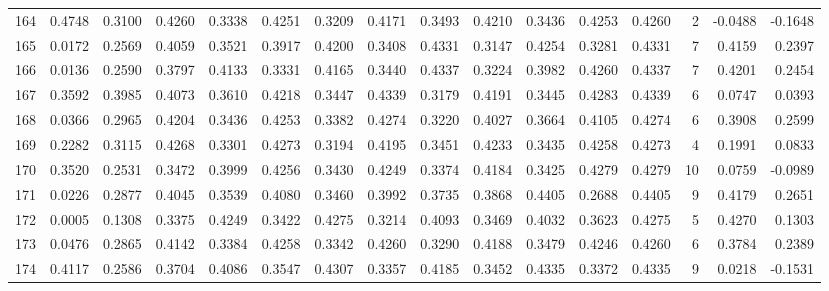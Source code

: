 \begin{tabular}{lrrrrrrrrrrrrrrr}
164 &      0.4748 &  0.3100 &  0.4260 &  0.3338 &  0.4251 &  0.3209 &  0.4171 &  0.3493 &  0.4210 &  0.3436 &   0.4253 &     0.4260 &      2 &                   -0.0488 &                    -0.1648 \\
165 &      0.0172 &  0.2569 &  0.4059 &  0.3521 &  0.3917 &  0.4200 &  0.3408 &  0.4331 &  0.3147 &  0.4254 &   0.3281 &     0.4331 &      7 &                    0.4159 &                     0.2397 \\
166 &      0.0136 &  0.2590 &  0.3797 &  0.4133 &  0.3331 &  0.4165 &  0.3440 &  0.4337 &  0.3224 &  0.3982 &   0.4260 &     0.4337 &      7 &                    0.4201 &                     0.2454 \\
167 &      0.3592 &  0.3985 &  0.4073 &  0.3610 &  0.4218 &  0.3447 &  0.4339 &  0.3179 &  0.4191 &  0.3445 &   0.4283 &     0.4339 &      6 &                    0.0747 &                     0.0393 \\
168 &      0.0366 &  0.2965 &  0.4204 &  0.3436 &  0.4253 &  0.3382 &  0.4274 &  0.3220 &  0.4027 &  0.3664 &   0.4105 &     0.4274 &      6 &                    0.3908 &                     0.2599 \\
169 &      0.2282 &  0.3115 &  0.4268 &  0.3301 &  0.4273 &  0.3194 &  0.4195 &  0.3451 &  0.4233 &  0.3435 &   0.4258 &     0.4273 &      4 &                    0.1991 &                     0.0833 \\
170 &      0.3520 &  0.2531 &  0.3472 &  0.3999 &  0.4256 &  0.3430 &  0.4249 &  0.3374 &  0.4184 &  0.3425 &   0.4279 &     0.4279 &     10 &                    0.0759 &                    -0.0989 \\
171 &      0.0226 &  0.2877 &  0.4045 &  0.3539 &  0.4080 &  0.3460 &  0.3992 &  0.3735 &  0.3868 &  0.4405 &   0.2688 &     0.4405 &      9 &                    0.4179 &                     0.2651 \\
172 &      0.0005 &  0.1308 &  0.3375 &  0.4249 &  0.3422 &  0.4275 &  0.3214 &  0.4093 &  0.3469 &  0.4032 &   0.3623 &     0.4275 &      5 &                    0.4270 &                     0.1303 \\
173 &      0.0476 &  0.2865 &  0.4142 &  0.3384 &  0.4258 &  0.3342 &  0.4260 &  0.3290 &  0.4188 &  0.3479 &   0.4246 &     0.4260 &      6 &                    0.3784 &                     0.2389 \\
174 &      0.4117 &  0.2586 &  0.3704 &  0.4086 &  0.3547 &  0.4307 &  0.3357 &  0.4185 &  0.3452 &  0.4335 &   0.3372 &     0.4335 &      9 &                    0.0218 &                    -0.1531 \\

\end{tabular}
